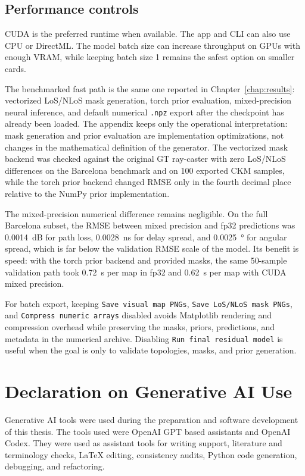 \section{Performance controls}

CUDA is the preferred runtime when available. The app and CLI can also use CPU
or DirectML. The model batch size can increase throughput on GPUs with enough
VRAM, while keeping batch size 1 remains the safest option on smaller cards.

The benchmarked fast path is the same one reported in
Chapter~\ref{chap:results}: vectorized LoS/NLoS mask generation, torch prior
evaluation, mixed-precision neural inference, and default numerical
\texttt{.npz} export after the checkpoint has already been loaded. The appendix
keeps only the operational interpretation: mask generation and prior evaluation
are implementation optimizations, not changes in the mathematical definition of
the generator. The vectorized mask backend was checked against the original
GT ray-caster with zero LoS/NLoS differences on the Barcelona benchmark and on
100 exported CKM samples, while the torch prior backend changed RMSE only in
the fourth decimal place relative to the NumPy prior implementation.

The mixed-precision numerical difference remains negligible. On the full
Barcelona subset, the RMSE between mixed precision and fp32 predictions was
\SI{0.0014}{dB} for path loss, \SI{0.0028}{ns} for delay spread, and
\SI{0.0025}{\degree} for angular spread, which is far below the validation RMSE
scale of the model. Its benefit is speed: with the torch prior backend and
provided masks, the same 50-sample validation path took \SI{0.72}{s} per map in
fp32 and \SI{0.62}{s} per map with CUDA mixed precision.

For batch export, keeping \texttt{Save visual map PNGs},
\texttt{Save LoS/NLoS mask PNGs}, and \texttt{Compress numeric arrays}
disabled avoids Matplotlib rendering and compression overhead while preserving
the masks, priors, predictions, and metadata in the numerical archive.
Disabling \texttt{Run final residual model} is useful when the goal is only to
validate topologies, masks, and prior generation.
\endgroup

\chapter{Declaration on Generative AI Use}
\label{app:generative_ai_declaration}

Generative AI tools were used during the preparation and software development
of this thesis. The tools used were OpenAI GPT based assistants and OpenAI
Codex. They were used as assistant tools for writing support, literature and
terminology checks, LaTeX editing, consistency audits, Python code generation,
debugging, and refactoring.

